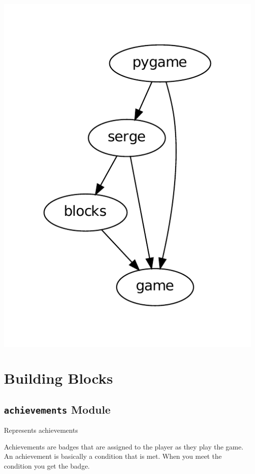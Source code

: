 \documentclass[letterpaper,10pt,english]{sphinxmanual}
\begin{document}
\includegraphics{graphviz-e105d178f146796d84ac12b606890fb9e5d18932.pdf}


\section{Building Blocks}
\label{blocks:building-blocks}\label{blocks::doc}

\subsection{\texttt{achievements} Module}
\label{blocks:module-serge.blocks.achievements}\label{blocks:achievements-module}
Represents achievements

Achievements are badges that are assigned to the
player as they play the game. An achievement is
basically a condition that is met. When you meet
the condition you get the badge.
\end{document}
